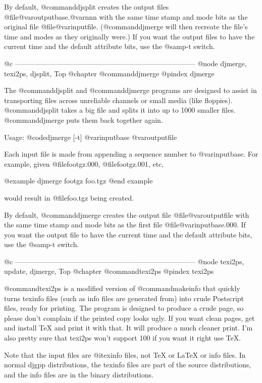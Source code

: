 By default, @command{djsplit} creates the output files
@file{@var{outputbase}.@var{nnn}} with the same time stamp and mode bits
as the original file @file{@var{inputfile}}.  (@command{djmerge} will then
recreate the file's time and modes as they originally were.)  If you
want the output files to have the current time and the default attribute
bits, use the @samp{-t} switch.

@c -----------------------------------------------------------------------------
@node djmerge, texi2ps, djsplit, Top
@chapter @command{djmerge}
@pindex djmerge

The @command{djsplit} and @command{djmerge} programs are designed to assist in
transporting files across unreliable channels or small media (like
floppies).  @command{djsplit} takes a big file and splits it into up to 1000
smaller files.  @command{djmerge} puts them back together again.

Usage: @code{djmerge [-t] @var{inputbase} @var{outputfile}}

Each input file is made from appending a sequence number to
@var{inputbase}.  For example, given @file{footgz.000},
@file{footgz.001}, etc,

@example
djmerge footgz foo.tgz
@end example

would result in @file{foo.tgz} being created.

By default, @command{djmerge} creates the output file
@file{@var{outputfile}} with the same time stamp and mode bits as the
first file @file{@var{inputbase}.000}.  If you want the output file to
have the current time and the default attribute bits, use the @samp{-t}
switch.

@c -----------------------------------------------------------------------------
@node texi2ps, update, djmerge, Top
@chapter @command{texi2ps}
@pindex texi2ps

@command{texi2ps} is a modified version of @command{makeinfo} that quickly turns
texinfo files (such as info files are generated from) into crude
Postscript files, ready for printing.  The program is designed to
produce a crude page, so please don't complain if the printed copy looks
ugly.  If you want clean pages, get and install TeX and print it with
that.  It will produce a much cleaner print.  I'm also pretty sure that
texi2ps won't support 100%
if you want it right use TeX.

Note that the input files are @i{texinfo} files, not TeX or LaTeX or
info files.  In normal djgpp distributions, the texinfo files are part
of the source distributions, and the info files are in the binary
distributions.

